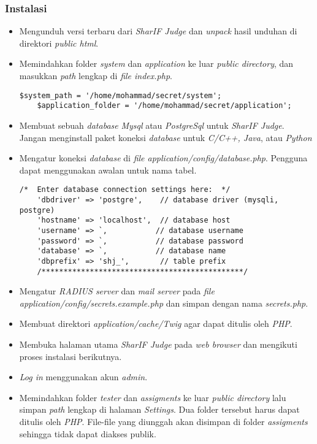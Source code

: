 \subsubsection{Instalasi}
\label{subsubsec:instalasi}
\begin{itemize}
	\item Mengunduh versi terbaru dari \textit{SharIF Judge} dan \textit{unpack} hasil unduhan di direktori \textit{public html}.
	\item Memindahkan folder \textit{system} dan \textit{application} ke luar \textit{public directory}, dan masukkan \textit{path} lengkap di \textit{file index.php}.
	\begin{lstlisting}[basicstyle=\ttfamily, frame=single,
	columns=fullflexible, keepspaces=true, breaklines=true, label=ls:2]
	$system_path = '/home/mohammad/secret/system';
	$application_folder = '/home/mohammad/secret/application';
	\end{lstlisting}
	\item Membuat sebuah \textit{database} \textit{Mysql} atau \textit{PostgreSql} untuk \textit{SharIF Judge}. Jangan menginstall paket koneksi \textit{database} untuk \textit{C/C++, Java}, atau \textit{Python}
	\item Mengatur koneksi \textit{database} di \textit{file application/config/database.php}. Pengguna dapat
	menggunakan awalan untuk nama tabel.
	\begin{lstlisting}[basicstyle=\ttfamily, frame=single,
	columns=fullflexible, keepspaces=true, breaklines=true, label=ls:3]
	/*  Enter database connection settings here:  */
	'dbdriver' => 'postgre',    // database driver (mysqli, postgre)
	'hostname' => 'localhost',  // database host
	'username' => `,           // database username
	'password' => `,           // database password
	'database' => `,           // database name
	'dbprefix' => 'shj_',       // table prefix
	/**********************************************/
	\end{lstlisting}
	\item Mengatur \textit{RADIUS server} dan \textit{mail server} pada \textit{file application/config/secrets.example.php} dan simpan dengan nama \textit{secrets.php}.
	\item Membuat direktori \textit{application/cache/Twig} agar dapat ditulis oleh \textit{PHP}.
	\item Membuka halaman utama \textit{SharIF Judge} pada \textit{web browser} dan mengikuti proses instalasi berikutnya.
	\item \textit{Log in} menggunakan akun \textit{admin}.
	\item Memindahkan folder \textit{tester} dan \textit{assigments} ke luar \textit{public directory} lalu simpan \textit{path} lengkap di halaman \textit{Settings}. Dua folder tersebut harus dapat ditulis oleh \textit{PHP}. File-file yang diunggah
	akan disimpan di folder \textit{assigments} sehingga tidak dapat diakses publik.
\end{itemize}

